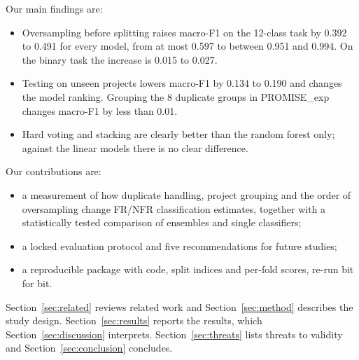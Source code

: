 Our main findings are:
\begin{itemize}
\item Oversampling before splitting raises macro-F1 on the 12-class task by 0.392 to 0.491 for every model, from at most 0.597 to between 0.951 and 0.994. On the binary task the increase is 0.015 to 0.027.
\item Testing on unseen projects lowers macro-F1 by 0.134 to 0.190 and changes the model ranking. Grouping the 8 duplicate groups in PROMISE\_exp changes macro-F1 by less than 0.01.
\item Hard voting and stacking are clearly better than the random forest only; against the linear models there is no clear difference.
\end{itemize}

Our contributions are:
\begin{itemize}
\item a measurement of how duplicate handling, project grouping and the order of oversampling change FR/NFR classification estimates, together with a statistically tested comparison of ensembles and single classifiers;
\item a locked evaluation protocol and five recommendations for future studies;
\item a reproducible package with code, split indices and per-fold scores, re-run bit for bit.
\end{itemize}

Section~\ref{sec:related} reviews related work and Section~\ref{sec:method} describes the study design. Section~\ref{sec:results} reports the results, which Section~\ref{sec:discussion} interprets. Section~\ref{sec:threats} lists threats to validity and Section~\ref{sec:conclusion} concludes.
